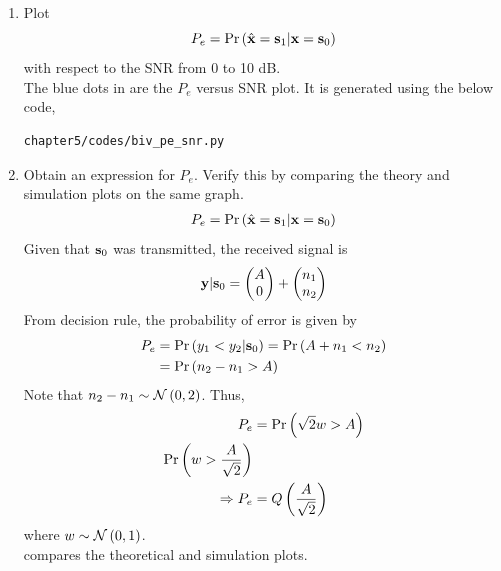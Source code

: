 \begin{enumerate}
%
\item
Plot 
\begin{equation} 
P_e = \Pr\left(\hat{\mathbf{x}} = \mathbf{s}_1|\mathbf{x} = \mathbf{s}_0\right)
\label{eq:prob_error_fsk}
\end{equation}
with respect to the SNR from 0 to 10 dB.\\
\solution The blue dots in  are the $P_e$ versus SNR plot. It is generated using the below code,
\begin{lstlisting}
chapter5/codes/biv_pe_snr.py
\end{lstlisting}
%
\item
Obtain an expression for $P_e$. Verify this by comparing the theory and simulation plots on the same graph.\\
\solution \begin{align}
    P_e = \Pr\left(\hat{\mathbf{x}} = \mathbf{s}_1|\mathbf{x} = \mathbf{s}_0\right)
    \end{align}
    Given that $\mathbf{s}_0$ was transmitted, the received signal is
    \begin{align}
    \mathbf{y}|\mathbf{s}_0 = \begin{pmatrix} A \\ 0 \end{pmatrix} + \begin{pmatrix} n_1 \\ n_2 \end{pmatrix}
    \end{align}
    From decision rule, the probability of error is given by 
    \begin{align}
    P_e &= \Pr\left(y_1 < y_2 |\mathbf{s}_0\right) = \Pr\left(A+n_1 < n_2\right)\\
    &= \Pr\left(n_2 - n_1 > A\right)
    \end{align}
    Note that $n_2 - n_1 \sim \mathcal{N}\left(0,2\right)$. Thus,
    \begin{align}
    P_e &= \Pr\left(\sqrt{2}w > A\right)\\
    \Pr\left(w > \dfrac{A}{\sqrt{2}}\right)\\
    \Rightarrow P_e &= Q\left(\frac{A}{\sqrt{2}}\right)
    \end{align}
    where $w \sim \mathcal{N}\left(0,1\right)$. \\
 compares the theoretical and simulation plots.


\end{enumerate}
